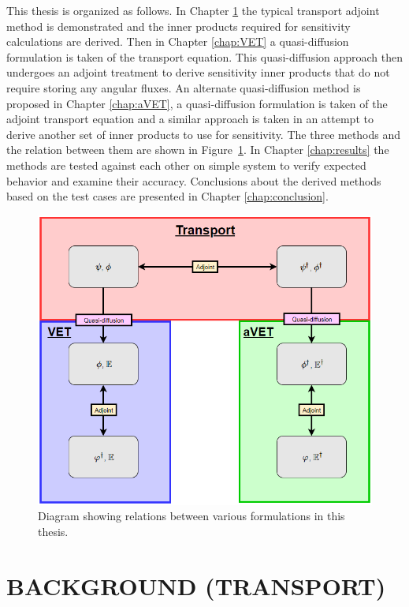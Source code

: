 \documentclass[12pt]{report}
\begin{document}
This thesis is organized as follows. In Chapter \ref{chap:background} the typical transport adjoint method is demonstrated and the inner products required for sensitivity calculations are derived. Then in Chapter \ref{chap:VET} a quasi-diffusion formulation is taken of the transport equation. This quasi-diffusion approach then undergoes an adjoint treatment to derive sensitivity inner products that do not require storing any angular fluxes. An alternate quasi-diffusion method is proposed in Chapter \ref{chap:aVET}, a quasi-diffusion formulation is taken of the adjoint transport equation and a similar approach is taken in an attempt to derive another set of inner products to use for sensitivity. The three methods and the relation between them are shown in Figure~\ref{fig:roadmap}. In Chapter \ref{chap:results} the methods are tested against each other on simple system to verify expected behavior and examine their accuracy. Conclusions about the derived methods based on the test cases are presented in Chapter \ref{chap:conclusion}.

\begin{figure}[H]
\centering
  \includegraphics[scale=0.6]{figures2/RoadMap.png}
  \caption{Diagram showing relations between various formulations in this thesis.}
  \label{fig:roadmap}
\end{figure}


\chapter{\uppercase {Background (Transport)}} \label{chap:background}
\end{document}
